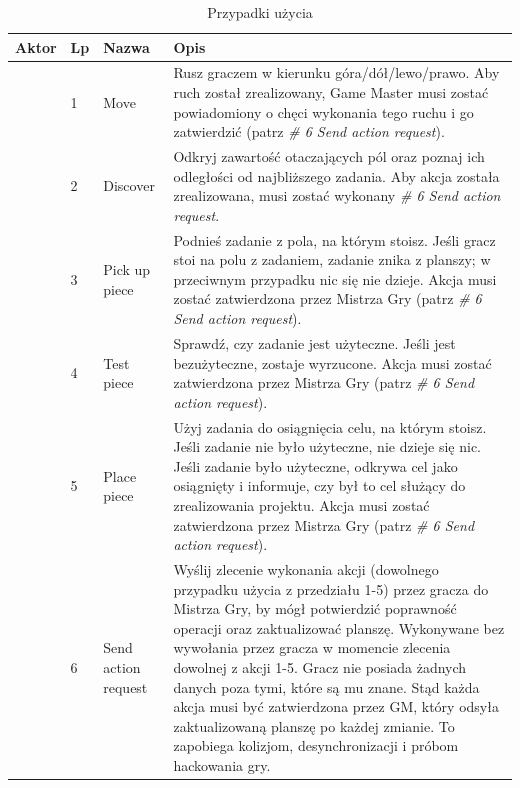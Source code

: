 \documentclass[11pt]{article}
\begin{document}




\hspace*{-4cm}
\begin{longtable}{|p{}|p{}|p{}|p{}|}
\caption{Przypadki użycia}
\\
\hline
Aktor 
& Lp 
& Nazwa 
& Opis 
\\ \hline
\endhead
\hline
\endfoot
\multirow{11}{.20\textwidth}{Gracz/Kapitan Drużyny} 
& 1 
& Move 
& Rusz graczem w kierunku góra/dół/lewo/prawo. Aby ruch został zrealizowany, Game Master musi zostać powiadomiony o chęci wykonania tego ruchu i go zatwierdzić (patrz \textit{\# 6 Send action request}). 
\\ \cline{2-4}
& 2 
& Discover 
& Odkryj zawartość otaczających pól oraz poznaj ich odległości od najbliższego zadania. Aby akcja została zrealizowana, musi zostać wykonany \textit{\# 6 Send action request}.
\\ \cline{2-4}
& 3 
& Pick up piece 
& Podnieś zadanie z pola, na którym stoisz. Jeśli gracz stoi na polu z zadaniem, zadanie znika z planszy; w przeciwnym przypadku nic się nie dzieje. Akcja musi zostać zatwierdzona przez Mistrza Gry (patrz \textit{\# 6 Send action request}).
\\ \cline{2-4}
& 4 
& Test piece 
& Sprawdź, czy zadanie jest użyteczne. Jeśli jest bezużyteczne, zostaje wyrzucone. Akcja musi zostać zatwierdzona przez Mistrza Gry (patrz \textit{\# 6 Send action request}).
\\ \cline{2-4}
& 5 
& Place piece 
& Użyj zadania do osiągnięcia celu, na którym stoisz. Jeśli zadanie nie było użyteczne, nie dzieje się nic. Jeśli zadanie było użyteczne, odkrywa cel jako osiągnięty i informuje, czy był to cel służący do zrealizowania projektu. Akcja musi zostać zatwierdzona przez Mistrza Gry (patrz \textit{\# 6 Send action request}). 
\\ \cline{2-4}
& 6 
& Send action request 
& Wyślij zlecenie wykonania akcji (dowolnego przypadku użycia z przedziału 1-5) przez gracza do Mistrza Gry, by mógł potwierdzić poprawność operacji oraz zaktualizować planszę. Wykonywane bez wywołania przez gracza w momencie zlecenia dowolnej z akcji 1-5. Gracz nie posiada żadnych danych poza tymi, które są mu znane. Stąd każda akcja musi być zatwierdzona przez GM, który odsyła zaktualizowaną planszę po każdej zmianie. To zapobiega kolizjom, desynchronizacji i próbom hackowania gry.

\end{longtable}
\end{document}
